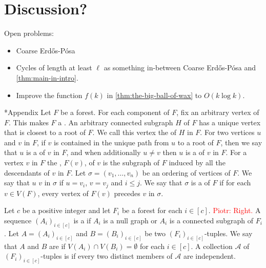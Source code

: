 \documentclass{patmorin}
\newenvironment{dummy}{}
\newcommand{\pat}[1]{\textcolor{Blue}{[Pat: #1]}}
\newcommand{\piotr}[1]{\textcolor{red}{Piotr: #1}}
\begin{document}
\begin{dummy}
\color{red}
\section{Discussion?}

Open problems:
\begin{itemize}
    \item Coarse Erd\H{o}s-Pósa
    \item Cycles of length at least $\ell$ as something in-between Coarse Erd\H{o}s-Pósa and \cref{thm:main-in-intro}.
    \item Improve the function $f(k)$ in \cref{thm:the-big-ball-of-wax} to $O(k\log k)$.
\end{itemize}
\end{dummy}




\section*{Appendix}
Let $F$ be a forest. 
For each component of $F$, fix an arbitrary vertex of $F$. This makes $F$ a . 
An arbitrary connected subgraph $H$ of $F$ has a unique vertex that is closest to a root of $F$. We call this vertex the  of $H$ in $F$. 
For two vertices $u$ and $v$ in $F$, 
if $v$ is contained in the unique path from $u$ to a root of $F$, then we say that $u$ is a  of $v$ in $F$, and when additionally $u\neq v$  then $u$ is a  of $v$ in $F$.
For a vertex $v$ in $F$ the , $F(v)$, of $v$ is the subgraph of $F$ induced by all the descendants of $v$ in $F$.
Let $\sigma=(v_1,\ldots,v_n)$ be an ordering of vertices of $F$. 
We say that $u$  $v$ in $\sigma$ if $u=v_i$, $v=v_j$ and $i\leq j$. 
We say that $\sigma$ is a  of $F$ if for each $v\in V(F)$, every vertex of $F(v)$ precedes $v$ in $\sigma$.

Let $c$ be a positive integer and 
let $F_i$ be a forest for each $i\in[c]$. 
\piotr{Right.}
A sequence $(A_i)_{i\in[c]}$ is a  if 
$A_i$ is a null graph or $A_i$ is a connected subgraph of $F_i$. 
Let $A=(A_i)_{i\in[c]}$ and $B=(B_i)_{i\in[c]}$ be two $(F_i)_{i\in[c]}$-tuples. 
We say that $A$ and $B$ are  if 
$V(A_i)\cap V(B_i)=\emptyset$ for each $i\in[c]$.
A collection $\mathcal{A}$ of $(F_i)_{i\in[c]}$-tuples is  if every two distinct members of $\mathcal{A}$ are independent.
\end{document}
